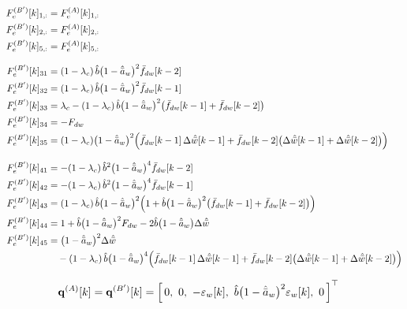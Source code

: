 \documentclass[11pt,a4paper,fontset=none]{ctexart}
\newcommand{\ba}{\bar{a}}
\newcommand{\bw}{\bar{w}}
\newcommand{\dWh}{\Delta\hat{\bw}}
\newcommand{\ah}{\hat{\ba}_w}
\newcommand{\bh}{\hat{b}}
\newcommand{\fd}{\bar f_{dw}}
\begin{document}
\begin{align*}
F_e^{(B')}[k]_{1,:} &= F_e^{(A)}[k]_{1,:} \\
F_e^{(B')}[k]_{2,:} &= F_e^{(A)}[k]_{2,:} \\
F_e^{(B')}[k]_{5,:} &= F_e^{(A)}[k]_{5,:} \\[8pt]
F_e^{(B')}[k]_{31} &= (1-\lambda_c)\,\bh\bigl(1-\ah\bigr)^{2}\fd[k-2] \\
F_e^{(B')}[k]_{32} &= (1-\lambda_c)\,\bh\bigl(1-\ah\bigr)^{2}\fd[k-1] \\
F_e^{(B')}[k]_{33} &= \lambda_c - (1-\lambda_c)\,\bh\bigl(1-\ah\bigr)^{2}\bigl(\fd[k-1] + \fd[k-2]\bigr) \\
F_e^{(B')}[k]_{34} &= -F_{dw} \\
F_e^{(B')}[k]_{35} &= (1-\lambda_c)\bigl(1-\ah\bigr)^{2}\Bigl(\fd[k-1]\,\dWh[k-1] + \fd[k-2]\bigl(\dWh[k-1] + \dWh[k-2]\bigr)\Bigr) \\[8pt]
F_e^{(B')}[k]_{41} &= -(1-\lambda_c)\,\bh^{2}\bigl(1-\ah\bigr)^{4}\fd[k-2] \\
F_e^{(B')}[k]_{42} &= -(1-\lambda_c)\,\bh^{2}\bigl(1-\ah\bigr)^{4}\fd[k-1] \\
F_e^{(B')}[k]_{43} &= (1-\lambda_c)\,\bh\bigl(1-\ah\bigr)^{2}\Bigl(1 + \bh\bigl(1-\ah\bigr)^{2}\bigl(\fd[k-1] + \fd[k-2]\bigr)\Bigr) \\
F_e^{(B')}[k]_{44} &= 1 + \bh\bigl(1-\ah\bigr)^{2}F_{dw} - 2\bh\bigl(1-\ah\bigr)\dWh \\
F_e^{(B')}[k]_{45} &= \bigl(1-\ah\bigr)^{2}\dWh \\
                   &\quad - (1-\lambda_c)\,\bh\bigl(1-\ah\bigr)^{4}\Bigl(\fd[k-1]\,\dWh[k-1] + \fd[k-2]\bigl(\dWh[k-1] + \dWh[k-2]\bigr)\Bigr)
\end{align*}

\begin{align*}
\mathbf{q}^{(A)}[k] = \mathbf{q}^{(B')}[k] &= \Bigl[\,0,\ 0,\ -\varepsilon_w[k],\ \bh\bigl(1-\ah\bigr)^{2}\varepsilon_w[k],\ 0\,\Bigr]^{\top}
\end{align*}
\end{document}
